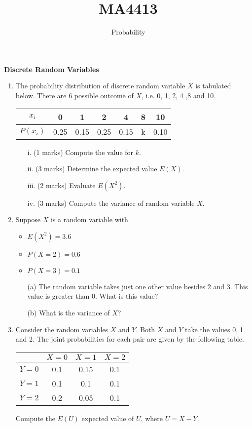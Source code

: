 \documentclass[12pt]{article}
\title{MA4413}
\author{Probability}
\begin{document}
\textbf{\;\;\;Discrete Random Variables}
\begin{enumerate}
\item  The probability distribution of discrete random variable $X$ is tabulated below. There are 6 possible outcome of $X$, i.e. 0, 1, 2, 4 ,8 and 10.
\begin{center}
\begin{tabular}{|c||c|c|c|c|c|c|}
\hline
$x_i$  & 0 & 1 & 2 & 4 & 8 & 10 \\\hline
$P(x_i)$ & 0.25 & 0.15 & 0.25 & 0.15 & k & 0.10\\
\hline
\end{tabular}
\end{center}

\begin{itemize}
\item[i.] (1 marks) Compute the value for $k$.
\item[ii.] (3 marks) Determine the expected value $E(X)$.
\item[iii.] (2 marks) Evaluate $E(X^2)$.
\item[iv.] (3 marks) Compute the variance of random variable $X$.
\end{itemize}
\item 
Suppose $X$ is a random variable with 
\begin{itemize}
\item $E(X^2)=3.6$
\item $P(X=2)=0.6$
\item $P(X=3)=0.1$
\end{itemize}

\begin{itemize}
\item[(a)] The random variable takes just one other value besides 2 and 3. This value is greater than 0. What is this value?
\item[(b)] What is the variance of $X$?
\end{itemize}


\item Consider the random variables $X$ and $Y$. Both $X$ and $Y$ take the values 0,$\;$1 and 2. 
The joint probabilities for each pair are given by the following table.
\begin{center}
\begin{tabular}{|c|c|c|c|}
\hline  & $X=0$ & $X=1$ & $X=2$ \\ 
\hline $Y=0$ & 0.1 & 0.15 & 0.1 \\ 
\hline $Y=1$ & 0.1 & 0.1 & 0.1 \\ 
\hline $Y=2$ & 0.2 & 0.05 & 0.1 \\ 
\hline 
\end{tabular} 
\end{center}
Compute the $E(U)$ expected value of $U$, where $U=X-Y$.
\end{enumerate}
\end{document}
